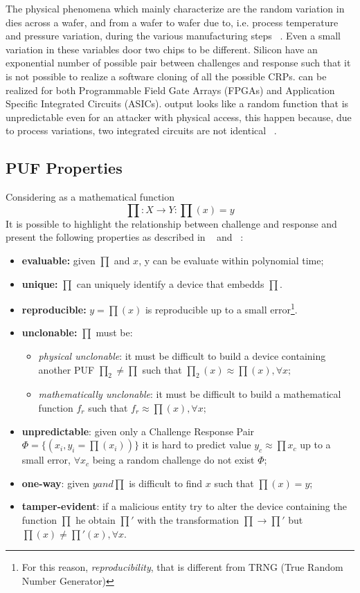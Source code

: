 \documentclass[../tesi.tex]{subfiles}
\begin{document}
The physical phenomena which mainly characterize \puf{} are the random variation in dies across a wafer, and from a wafer to wafer due to, i.e. process temperature and pressure variation, during the various manufacturing steps ~\cite{lofstrom2000ic}. Even a small variation in these variables door two chips to be different. 
Silicon  have an exponential number of possible pair between challenges and response such that it is not possible to realize a software cloning of all the possible CRPs. 
 can be realized for both Programmable Field Gate Arrays (FPGAs) and Application Specific Integrated Circuits (ASICs). 
 output looks like a random function that is unpredictable even for an attacker with physical access, this happen because, due to process variations, two integrated circuits are not identical ~\cite{suh2007physical}.
\subsection{PUF Properties}
Considering \puf{} as a mathematical function 
\begin{equation}
\prod : X  \rightarrow Y : \prod(x) = y 
\end{equation}
It is possible to highlight the relationship between challenge and response and present the following properties as described in ~\cite{maes2010physically} and ~\cite{gassend2002silicon}:
\begin{itemize}
\item \textbf{evaluable:} given $ \prod $ and $x$, y can be evaluate within polynomial time;
\item \textbf{unique:} $\prod$ can uniquely identify a device that embedds $\prod$.
\item \textbf{reproducible:} $y=\prod(x)$ is reproducible up to a small error\footnote{For this reason, \emph{reproducibility}, that \puf{} is different from TRNG (True Random Number Generator)}. 
\item \textbf{unclonable:} $\prod$ must be:
\begin{itemize}
\item \textit{physical unclonable}: it must be difficult to build a device containing another PUF $ \prod_{2}\neq \prod $ such that $ \prod_{2}(x) \approx \prod(x), \forall x; $
\item \textit{mathematically unclonable}: it must be difficult to build a mathematical function $f_{r}$ such that $f_{r} \approx \prod(x), \forall x;$
\end{itemize}
\item \textbf{unpredictable}: given only a Challenge Response Pair $\Phi=\lbrace(x_{i},y_{i}=\prod(x_{i}))\rbrace$ it is hard to predict value  $y_{c} \approx \prod x_{c}$ up to a small error, $\forall x_{c}$ being a random challenge do not exist $\Phi$;
\item \textbf{one-way}: given $y and \prod$ is difficult to find $x$ such that $\prod(x) = y$;
\item \textbf{tamper-evident}: if a malicious entity try to alter the device containing the function $\prod$ he obtain $\prod'$ with the transformation $ \prod \longrightarrow \prod' $ but $\prod(x) \neq \prod'(x), \forall x $. 
\end{itemize}
\end{document}
